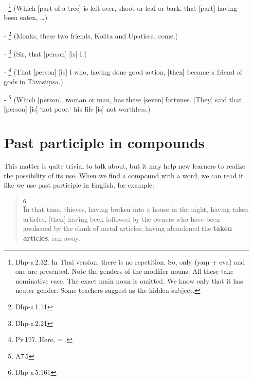 - \footnote{Dhp-a\,2.32. In Thai version, there is no repetition. So, only  (ya\d m + eva) and one  are presented. Note the genders of the modifier nouns. All these take nominative case. The exact main noun is omitted. We know only that it has neuter gender. Some teachers suggest  as the hidden subject.} (Which [part of a tree] is left over, shoot or leaf or bark, that [part] having been eaten, \ldots)\par
- \footnote{Dhp-a\,1.11} (Monks, these two friends, Kolita and Upatissa, come.)\par
- \footnote{Dhp-a\,2.21} (Sir, that [person] [is] I.)\par
- \footnote{Pv\,197. Here,  = .} (That [person] [is] I who, having done good action, [then] became a friend of gods in T\=avasi\d msa.)\par
- \footnote{A7\,5} (Which [person], woman or man, has these [seven] fortunes. [They] said that [person] [is] `not poor,' his life [is] not worthless.)\par

{}
\section*{Past participle in compounds}

This matter is quite trivial to talk about, but it may help new learners to realize the possibility of its use. When we find a compound with a  word, we can read it like we use past participle in English, for example:

\begin{quote}
\footnote{Dhp-a\,5.161}\\
In that time, thieves, having broken into a house in the night, having taken articles, [then] having been followed by the owners who have been awakened by the clank of metal articles, having abandoned the \textbf{taken articles}, ran away.
\end{quote}


